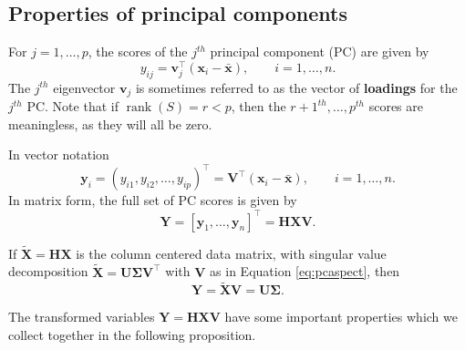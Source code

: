 \documentclass[]{book}
\theoremstyle{definition}
\theoremstyle{definition}
\theoremstyle{definition}
\theoremstyle{remark}
\begin{document}
\hypertarget{properties-of-principal-components}{%
\subsection{Properties of principal components}\label{properties-of-principal-components}}

For \(j=1, \ldots , p\), the scores of the \(j^{th}\) principal component (PC) are given by
\[
y_{ij}=\mathbf v_j^\top(\mathbf x_i - \bar{\mathbf x}), \qquad i=1, \ldots , n.
\]
The \(j^{th}\) eigenvector \(\mathbf v_j\) is sometimes referred to as the vector of \textbf{loadings} for the \(j^{th}\) PC. Note that if \(\operatorname{rank}(S)=r<p\), then the \(r+1^{th}, \ldots, p^{th}\) scores are meaningless, as they will all be zero.

In vector notation
\[
\mathbf y_i=( y_{i1}, y_{i2}, \ldots , y_{ip})^\top = \mathbf V^\top (\mathbf x_i -\bar{\mathbf x}), \qquad i=1, \ldots ,n.
\]
In matrix form, the full set of PC scores is given by
\[
\mathbf Y= [\mathbf y_1 , \ldots , \mathbf y_n]^\top =\mathbf H\mathbf X\mathbf V.
\]

If \(\tilde{\mathbf X}=\mathbf H\mathbf X\) is the column centered data matrix, with singular value decomposition
\(\tilde{\mathbf X}=\mathbf U\boldsymbol{\Sigma}\mathbf V^\top\) with \(\mathbf V\) as in Equation \eqref{eq:pcaspect}, then
\[\mathbf Y= \tilde{\mathbf X}\mathbf V= \mathbf U\boldsymbol{\Sigma}.\]

The transformed variables \(\mathbf Y= \mathbf H\mathbf X\mathbf V\) have some important properties which we collect together in the following proposition.
\end{document}

